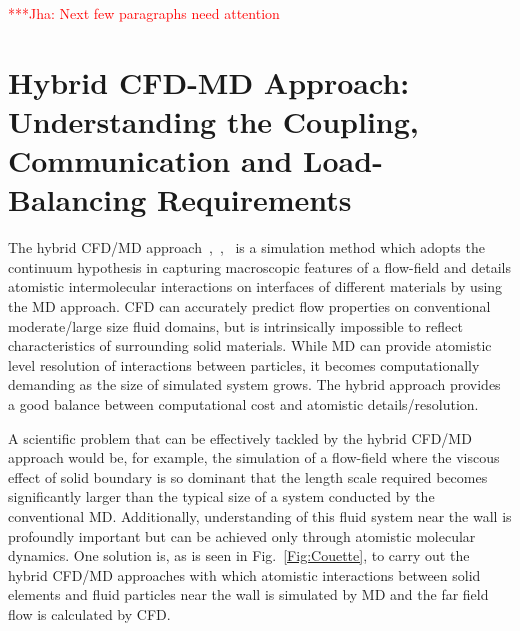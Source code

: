 \documentclass[conference,final]{IEEEtran}
\newcommand{\jhanote}[1]{ {\textcolor{red} { ***Jha: #1 }}}
\newcommand{\jhanote}[1]{}
\begin{document}
\jhanote{Next few paragraphs need attention}

\section{Hybrid CFD-MD Approach: Understanding the Coupling,
  Communication and Load-Balancing Requirements}

The hybrid CFD/MD approach~\cite{Thompson},~\cite{Nie},~\cite{Yen} is
a simulation method which adopts the continuum hypothesis in capturing
macroscopic features of a flow-field and details atomistic
intermolecular interactions on interfaces of different materials by
using the MD approach. CFD can accurately predict flow properties on
conventional moderate/large size fluid domains, but is intrinsically
impossible to reflect characteristics of surrounding solid materials.
While MD can provide atomistic level resolution of interactions
between particles, it becomes computationally demanding as the size of
simulated system grows. The hybrid approach provides a good balance
between computational cost and atomistic details/resolution.


A scientific problem that can be effectively tackled by the hybrid
CFD/MD approach would be, for example, the simulation of a flow-field
where the viscous effect of solid boundary is so dominant that the
length scale required becomes significantly larger than the typical
size of a system conducted by the conventional MD. Additionally,
understanding of this fluid system near the wall is profoundly
important but can be achieved only through atomistic molecular
dynamics. One solution is, as is seen in Fig.~\ref{Fig:Couette}, to
carry out the hybrid CFD/MD approaches with which atomistic
interactions between solid elements and fluid particles near the wall
is simulated by MD and the far field flow is calculated by CFD.
\end{document}
